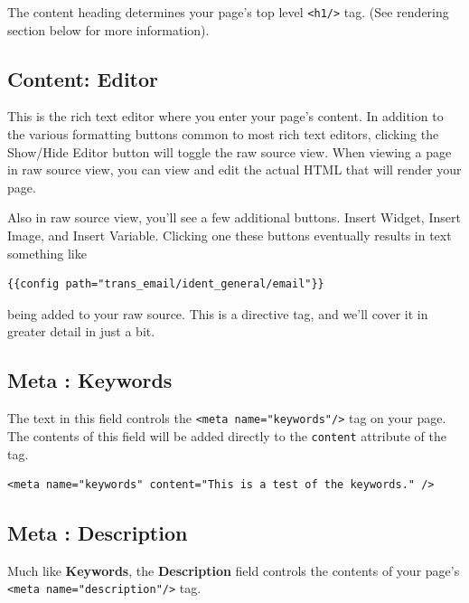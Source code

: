 \documentclass[oneside]{book}
\begin{document}
The content heading determines your page's top level \footnotesize\texttt{\textless h1/\textgreater } \normalsize  tag. (See rendering section below for more information).

\subsection{Content: Editor}

This is the rich text editor where you enter your page's content.  In addition to the various formatting buttons common to most rich text editors, clicking the Show/Hide Editor button will toggle the raw source view.  When viewing a page in raw source view, you can view and edit the actual HTML that will render your page.

Also in raw source view, you'll see a few additional buttons. Insert Widget, Insert Image, and Insert Variable.  Clicking one these buttons eventually results in text something like

\begin{lstlisting}
{{config path="trans_email/ident_general/email"}}

\end{lstlisting}


being added to your raw source. This is a directive tag, and we'll cover it in greater detail in just a bit.

\subsection{Meta : Keywords}

The text in this field controls the \footnotesize\texttt{\textless meta name="keywords"/\textgreater } \normalsize  tag on your page.  The contents of this field will be added directly to the \footnotesize\texttt{content} \normalsize  attribute of the tag.

\begin{lstlisting}
<meta name="keywords" content="This is a test of the keywords." />

\end{lstlisting}


\subsection{Meta : Description}

Much like \textbf{Keywords}, the \textbf{Description} field controls the contents of your page's \footnotesize\texttt{\textless meta name="description"/\textgreater } \normalsize  tag.
\end{document}

